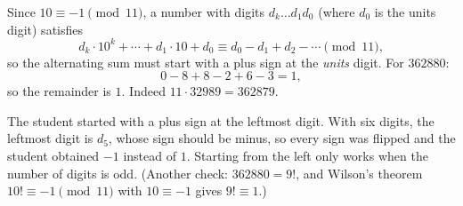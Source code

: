 Since $10\equiv-1\pmod{11}$, a number with digits $d_k\dots d_1d_0$ (where $d_0$ is the units digit) satisfies
\[d_k\cdot10^k+\cdots+d_1\cdot10+d_0\equiv d_0-d_1+d_2-\cdots\pmod{11},\]
so the alternating sum must start with a plus sign at the \emph{units} digit. For $362880$:
\[0-8+8-2+6-3=1,\]
so the remainder is $\boxed{1}$. Indeed $11\cdot32989=362879$.

The student started with a plus sign at the leftmost digit. With six digits, the leftmost digit is $d_5$, whose sign should be minus, so every sign was flipped and the student obtained $-1$ instead of $1$. Starting from the left only works when the number of digits is odd. (Another check: $362880=9!$, and Wilson's theorem $10!\equiv-1\pmod{11}$ with $10\equiv-1$ gives $9!\equiv1$.)
